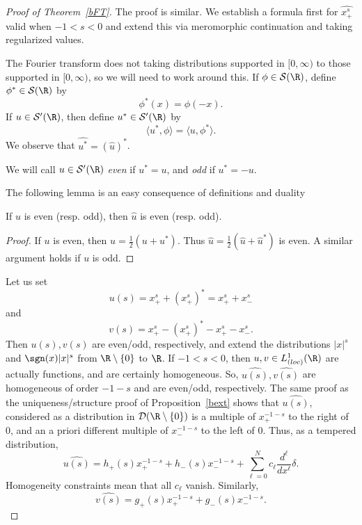 \documentclass[12pt]{article}
\begin{document}
\begin{proof}[Proof of Theorem~\ref{bFT}]The proof is similar. We establish a formula first for $\widehat{x_+^s}$ valid when $-1 < s < 0$ and extend this via meromorphic continuation and taking regularized values.

The Fourier transform does not taking distributions supported in $[0,\infty)$ to those supported in $[0,\infty)$, so we will need to work around this. If $\phi \in \mathcal S(\R)$, define $\phi^\ast \in \mathcal S(\R)$ by
\[\phi^{\ast}(x) = \phi(-x).\] If $u \in \mathcal S'(\R)$, then define $u^\ast \in \mathcal S'(\R)$ by
\[\langle u^\ast,\phi\rangle = \langle u,\phi^\ast\rangle.\] We observe that $\widehat{u^\ast} = (\widehat{u})^\ast$.

We will call $u \in \mathcal S'(\R)$ \emph{even} if $u^\ast = u$, and \emph{odd} if $u^\ast = -u$. 

The following lemma is an easy consequence of definitions and duality
\begin{lem}If $u$ is even (resp. odd), then $\hat{u}$ is even (resp. odd).\end{lem}
\begin{proof} If $u$ is even, then $u = \frac{1}{2}(u + u^\ast)$. Thus $\hat{u} = \frac{1}{2}(\hat{u}+\hat{u}^{\ast})$ is even. A similar argument holds if $u$ is odd.
\end{proof}

Let us set
\[u(s) = x_+^s + (x_+^s)^{\ast} = x_+^s + x_-^s\]
and
\[v(s) = x_+^s - (x_+^s)^{\ast} - x_+^s - x_-^s.\]
Then $u(s),v(s)$ are even/odd, respectively, and extend the distributions $|x|^s$ and $\sgn(x)|x|^s$ from $\R\setminus\{0\}$ to $\R$. If $-1 < s < 0$, then $u,v \in L^1_{\text(loc)}(\R)$ are actually functions, and are certainly homogeneous. So, $\widehat{u(s)},\widehat{v(s)}$ are homogeneous of order $-1-s$ and are even/odd, respectively. The same proof as the uniqueness/structure proof of Proposition~\ref{bext} shows that $\widehat{u(s)}$, considered as a distribution in $\mathcal D(\R\setminus\{0\})$ is a multiple of $x_+^{-1-s}$ to the right of $0$, and an a priori different multiple of $x_-^{-1-s}$ to the left of 0. Thus, as a tempered distribution,
\[\widehat{u(s)} = h_+(s)x_+^{-1-s} + h_-(s)x_-^{-1-s} + \sum_{\ell=0}^N c_\ell \frac{d^\ell}{dx^{\ell}}\delta.\] Homogeneity constraints mean that all $c_\ell$ vanish. Similarly,
\[\widehat{v(s)} = g_+(s)x_+^{-1-s} + g_-(s)x_-^{-1-s}.\]


\end{proof}
\end{document}
